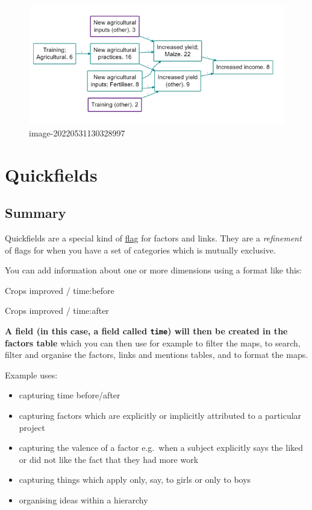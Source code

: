 \documentclass[
]{book}
\providecommand{\tightlist}{%
  \setlength{\itemsep}{0pt}\setlength{\parskip}{0pt}}
\begin{document}
\begin{figure}
\centering
\includegraphics{_assets/image-20220531130328997.png}
\caption{image-20220531130328997}
\end{figure}

\hypertarget{xquickfields}{%
\chapter{Quickfields}\label{xquickfields}}

\hypertarget{summary-9}{%
\section{Summary}\label{summary-9}}

Quickfields are a special kind of \protect\hyperlink{xflag}{flag} for factors and links. They are a \emph{refinement} of flags for when you have a set of categories which is mutually exclusive.

You can add information about one or more dimensions using a format like this:

Crops improved / time:before

Crops improved / time:after

\textbf{A field (in this case, a field called \texttt{time}) will then be created in the factors table} which you can then use for example to filter the maps, to search, filter and organise the factors, links and mentions tables, and to format the maps.

Example uses:

\begin{itemize}
\tightlist
\item
  capturing time before/after
\item
  capturing factors which are explicitly or implicitly attributed to a particular project
\item
  capturing the valence of a factor e.g.~when a subject explicitly says the liked or did not like the fact that they had more work
\item
  capturing things which apply only, say, to girls or only to boys
\item
  organising ideas within a hierarchy
\end{itemize}
\end{document}
